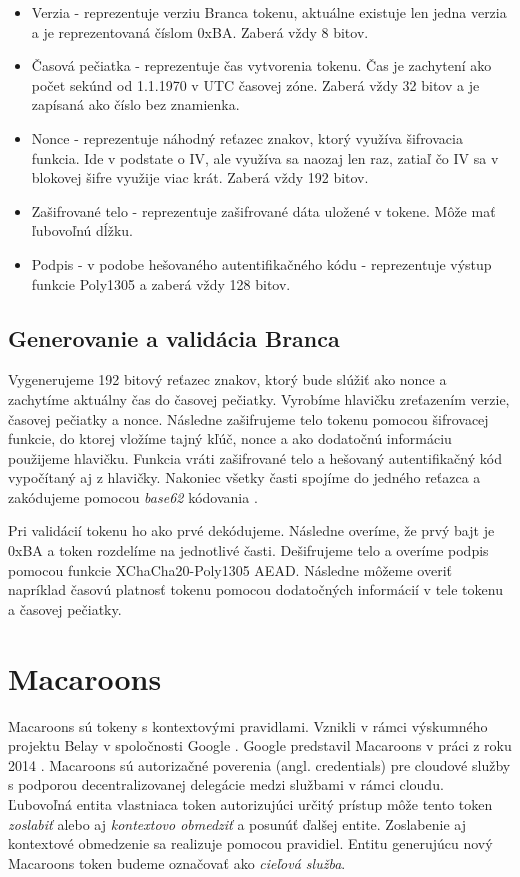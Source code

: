 \begin{itemize}
    \item Verzia - reprezentuje verziu Branca tokenu, aktuálne existuje len jedna verzia a je reprezentovaná číslom 0xBA. Zaberá vždy 8 bitov.
    \item Časová pečiatka - reprezentuje čas vytvorenia tokenu. Čas je zachytení ako počet sekúnd od 1.1.1970 v UTC časovej zóne. Zaberá vždy 32 bitov a je zapísaná ako číslo bez znamienka.
    \item Nonce - reprezentuje náhodný reťazec znakov, ktorý využíva šifrovacia funkcia. Ide v podstate o IV, ale využíva sa naozaj len raz, zatiaľ čo IV sa v blokovej šifre využije viac krát. Zaberá vždy 192 bitov.
    \item Zašifrované telo - reprezentuje zašifrované dáta uložené v tokene. Môže mať ľubovoľnú dĺžku.
    \item Podpis - v podobe hešovaného autentifikačného kódu - reprezentuje výstup funkcie Poly1305 a zaberá vždy 128 bitov.
\end{itemize}

\subsection{Generovanie a validácia Branca}

Vygenerujeme 192 bitový reťazec znakov, ktorý bude slúžiť ako nonce a zachytíme aktuálny čas do časovej pečiatky. Vyrobíme hlavičku zreťazením verzie, časovej pečiatky a nonce. Následne zašifrujeme telo tokenu pomocou šifrovacej funkcie, do ktorej vložíme tajný kľúč, nonce a ako dodatočnú informáciu použijeme hlavičku. Funkcia vráti zašifrované telo a hešovaný autentifikačný kód vypočítaný aj z hlavičky. Nakoniec všetky časti spojíme do jedného reťazca a zakódujeme pomocou \textit{base62} kódovania \cite{base62}.

Pri validácií tokenu ho ako prvé dekódujeme. Následne overíme, že prvý bajt je 0xBA a token rozdelíme na jednotlivé časti. Dešifrujeme telo a overíme podpis pomocou funkcie XChaCha20-Poly1305 AEAD. Následne môžeme overiť napríklad časovú platnosť tokenu pomocou dodatočných informácií v tele tokenu a časovej pečiatky.

\section{Macaroons}

Macaroons sú tokeny s kontextovými pravidlami. Vznikli v rámci výskumného projektu Belay v spoločnosti Google \cite{belay}. Google predstavil Macaroons v práci z roku 2014 \cite{macaroons_paper}. Macaroons sú autorizačné poverenia (angl. credentials) pre cloudové služby s podporou decentralizovanej delegácie medzi službami v rámci cloudu. Ľubovoľná entita vlastniaca token autorizujúci určitý prístup môže tento token \textit{zoslabiť} alebo aj \textit{kontextovo obmedziť} a posunúť ďalšej entite. Zoslabenie aj kontextové obmedzenie sa realizuje pomocou pravidiel. Entitu generujúcu nový Macaroons token budeme označovať ako \textit{cieľová služba}.

